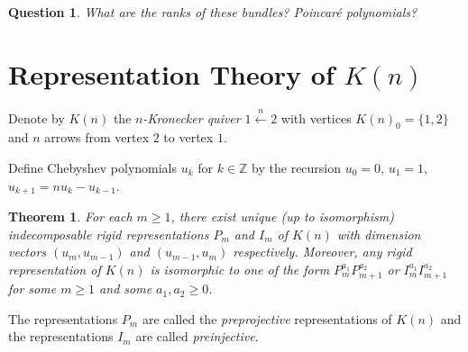 \documentclass{amsart}
\newtheorem{theorem}{Theorem}
\newtheorem{question}{Question}[theorem]
\newcommand{\ZZ}{\mathbb{Z}}
\begin{document}
\begin{question}
  What are the ranks of these bundles?  Poincar\'e polynomials?
\end{question}


\section{Representation Theory of $K(n)$}

Denote by $K(n)$ the \emph{$n$-Kronecker quiver} $1\stackrel{n}{\longleftarrow}2$ with vertices $K(n)_0=\{1,2\}$ and $n$ arrows from vertex $2$ to vertex $1$.  

Define Chebyshev polynomials $u_k$ for $k\in\ZZ$ by the recursion $u_0=0$, $u_1=1$, $u_{k+1}=nu_k-u_{k-1}$.
\begin{theorem}
  For each $m\ge1$, there exist unique (up to isomorphism) indecomposable rigid representations $P_m$ and $I_m$ of $K(n)$ with dimension vectors $(u_m,u_{m-1})$ and $(u_{m-1},u_m)$ respectively.
  Moreover, any rigid representation of $K(n)$ is isomorphic to one of the form $P_m^{a_1}P_{m+1}^{a_2}$ or $I_m^{a_1}I_{m+1}^{a_2}$ for some $m\ge1$ and some $a_1,a_2\ge0$.
\end{theorem}
The representations $P_m$ are called the \emph{preprojective} representations of $K(n)$ and the representations $I_m$ are called \emph{preinjective}.
\end{document}
